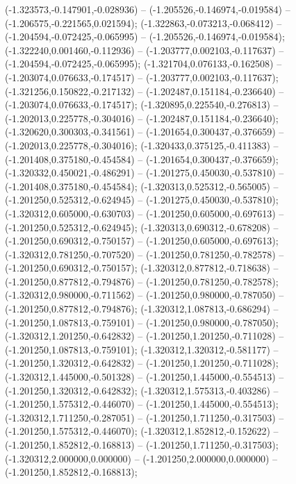  (-1.323573,-0.147901,-0.028936) -- (-1.205526,-0.146974,-0.019584) -- (-1.206575,-0.221565,0.021594);
 (-1.322863,-0.073213,-0.068412) -- (-1.204594,-0.072425,-0.065995) -- (-1.205526,-0.146974,-0.019584);
 (-1.322240,0.001460,-0.112936) -- (-1.203777,0.002103,-0.117637) -- (-1.204594,-0.072425,-0.065995);
 (-1.321704,0.076133,-0.162508) -- (-1.203074,0.076633,-0.174517) -- (-1.203777,0.002103,-0.117637);
 (-1.321256,0.150822,-0.217132) -- (-1.202487,0.151184,-0.236640) -- (-1.203074,0.076633,-0.174517);
 (-1.320895,0.225540,-0.276813) -- (-1.202013,0.225778,-0.304016) -- (-1.202487,0.151184,-0.236640);
 (-1.320620,0.300303,-0.341561) -- (-1.201654,0.300437,-0.376659) -- (-1.202013,0.225778,-0.304016);
 (-1.320433,0.375125,-0.411383) -- (-1.201408,0.375180,-0.454584) -- (-1.201654,0.300437,-0.376659);
 (-1.320332,0.450021,-0.486291) -- (-1.201275,0.450030,-0.537810) -- (-1.201408,0.375180,-0.454584);
 (-1.320313,0.525312,-0.565005) -- (-1.201250,0.525312,-0.624945) -- (-1.201275,0.450030,-0.537810);
 (-1.320312,0.605000,-0.630703) -- (-1.201250,0.605000,-0.697613) -- (-1.201250,0.525312,-0.624945);
 (-1.320313,0.690312,-0.678208) -- (-1.201250,0.690312,-0.750157) -- (-1.201250,0.605000,-0.697613);
 (-1.320312,0.781250,-0.707520) -- (-1.201250,0.781250,-0.782578) -- (-1.201250,0.690312,-0.750157);
 (-1.320312,0.877812,-0.718638) -- (-1.201250,0.877812,-0.794876) -- (-1.201250,0.781250,-0.782578);
 (-1.320312,0.980000,-0.711562) -- (-1.201250,0.980000,-0.787050) -- (-1.201250,0.877812,-0.794876);
 (-1.320312,1.087813,-0.686294) -- (-1.201250,1.087813,-0.759101) -- (-1.201250,0.980000,-0.787050);
 (-1.320312,1.201250,-0.642832) -- (-1.201250,1.201250,-0.711028) -- (-1.201250,1.087813,-0.759101);
 (-1.320312,1.320312,-0.581177) -- (-1.201250,1.320312,-0.642832) -- (-1.201250,1.201250,-0.711028);
 (-1.320312,1.445000,-0.501328) -- (-1.201250,1.445000,-0.554513) -- (-1.201250,1.320312,-0.642832);
 (-1.320312,1.575313,-0.403286) -- (-1.201250,1.575312,-0.446070) -- (-1.201250,1.445000,-0.554513);
 (-1.320312,1.711250,-0.287051) -- (-1.201250,1.711250,-0.317503) -- (-1.201250,1.575312,-0.446070);
 (-1.320312,1.852812,-0.152622) -- (-1.201250,1.852812,-0.168813) -- (-1.201250,1.711250,-0.317503);
 (-1.320312,2.000000,0.000000) -- (-1.201250,2.000000,0.000000) -- (-1.201250,1.852812,-0.168813);
